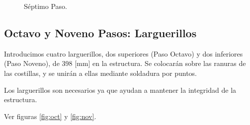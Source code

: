 \begin{figure}[!htb]
\centering
{}
\caption{Séptimo Paso. \label{fig:sept}}
\end{figure}


\subsection{Octavo y Noveno Pasos: Larguerillos}
Introducimos cuatro larguerillos, dos superiores (Paso Octavo) y dos inferiores (Paso Noveno), de 398 [mm] en la estructura. Se colocarán sobre las ranuras de las costillas, y se unirán a ellas mediante soldadura por puntos.

Los larguerillos son necesarios ya que ayudan a mantener la integridad de la estructura.

Ver figuras \ref{fig:oct} y \ref{fig:nov}.

